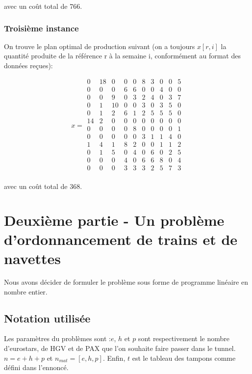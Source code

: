 \documentclass{rapport}
\begin{document}
avec un coût total de 766.

\subsubsection{Troisième instance}
On trouve le plan optimal de production suivant (on a toujours $x[r,i]$ la quantité produite de la référence r à la semaine i, conformément au format des données reçues):

\[x=
\begin{matrix}
0 & 18 & 0 & 0 & 0 & 8 & 3 & 0 & 0 & 5 \\
0 & 0 & 0 & 6 & 6 & 0 & 0 & 4 & 0 & 0 \\
0 & 0 & 9 & 0 & 3 & 2 & 4 & 0 & 3 & 7 \\
0 & 1 & 10 & 0 & 0 & 3 & 0 & 3 & 5 & 0 \\
0 & 1 & 2 & 6 & 1 & 2 & 5 & 5 & 5 & 0 \\
14 & 2 & 0 & 0 & 0 & 0 & 0 & 0 & 0 & 0 \\
0 & 0 & 0 & 0 & 8 & 0 & 0 & 0 & 0 & 1 \\
0 & 0 & 0 & 0 & 0 & 3 & 1 & 1 & 4 & 0 \\
1 & 4 & 1 & 8 & 2 & 0 & 0 & 1 & 1 & 2 \\
0 & 1 & 5 & 0 & 4 & 0 & 6 & 0 & 2 & 5 \\
0 & 0 & 0 & 4 & 0 & 6 & 6 & 8 & 0 & 4 \\
0 & 0 & 0 & 3 & 3 & 3 & 2 & 5 & 7 & 3 \\
\end{matrix}
\]

avec un coût total de 368.

\section{Deuxième partie - Un problème d'ordonnancement de trains et de navettes}

Nous avons décider de formuler le problème sous forme de programme linéaire en nombre entier.

\subsection{Notation utilisée}

Les paramètres du problèmes sont :$e$, $h$ et $p$ sont respectivement le nombre d'eurostars, de HGV et de PAX que l'on souhaite faire passer dans le tunnel. $n = e + h + p$ et $n_{mat} = [e, h, p]$. Enfin, $t$ est le tableau des tampons comme défini dans l'ennoncé.
\end{document}
